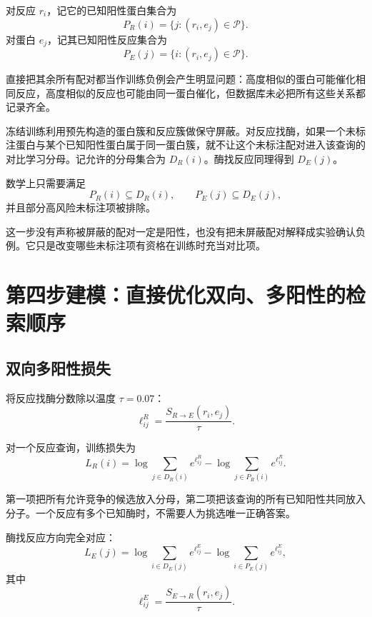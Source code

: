 \documentclass[UTF8,11pt,a4paper]{ctexart}
\newcommand{\Pset}{\mathcal P}
\begin{document}
对反应 $r_i$，记它的已知阳性蛋白集合为
\begin{equation}
P_R(i)=\{j:(r_i,e_j)\in\Pset\}.
\end{equation}
对蛋白 $e_j$，记其已知阳性反应集合为
\begin{equation}
P_E(j)=\{i:(r_i,e_j)\in\Pset\}.
\end{equation}

直接把其余所有配对都当作训练负例会产生明显问题：高度相似的蛋白可能催化相同反应，高度相似的反应也可能由同一蛋白催化，但数据库未必把所有这些关系都记录齐全。

冻结训练利用预先构造的蛋白簇和反应簇做保守屏蔽。对反应找酶，如果一个未标注蛋白与某个已知阳性蛋白属于同一蛋白簇，就不让这个未标注配对进入该查询的对比学习分母。记允许的分母集合为 $D_R(i)$。酶找反应同理得到 $D_E(j)$。

数学上只需要满足
\begin{equation}
P_R(i)\subseteq D_R(i),
\qquad
P_E(j)\subseteq D_E(j),
\end{equation}
并且部分高风险未标注项被排除。

\begin{keybox}
这一步没有声称被屏蔽的配对一定是阳性，也没有把未屏蔽配对解释成实验确认负例。它只是改变哪些未标注项有资格在训练时充当对比项。
\end{keybox}

\section{第四步建模：直接优化双向、多阳性的检索顺序}

\subsection{双向多阳性损失}

将反应找酶分数除以温度 $\tau=0.07$：
\begin{equation}
\ell^R_{ij}
=
\frac{S_{R\rightarrow E}(r_i,e_j)}{\tau}.
\end{equation}

对一个反应查询，训练损失为
\begin{equation}
L_R(i)
=
\log\sum_{j\in D_R(i)}e^{\ell^R_{ij}}
-
\log\sum_{j\in P_R(i)}e^{\ell^R_{ij}}.
\label{eq:r2e-contrastive}
\end{equation}

第一项把所有允许竞争的候选放入分母，第二项把该查询的所有已知阳性共同放入分子。一个反应有多个已知酶时，不需要人为挑选唯一正确答案。

酶找反应方向完全对应：
\begin{equation}
L_E(j)
=
\log\sum_{i\in D_E(j)}e^{\ell^E_{ij}}
-
\log\sum_{i\in P_E(j)}e^{\ell^E_{ij}},
\label{eq:e2r-contrastive}
\end{equation}
其中
\begin{equation}
\ell^E_{ij}=\frac{S_{E\rightarrow R}(r_i,e_j)}{\tau}.
\end{equation}
\end{document}
